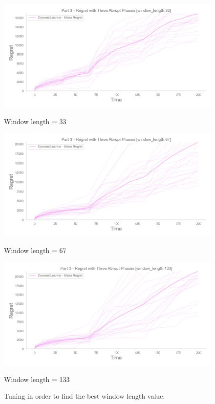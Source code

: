 \begin{figure}[!htb]
	\centering

  		\includegraphics[width=\linewidth]{images/win_length33.png}
  		\caption{Window length = 33}\label{win33}  		
	\endminipage\hfill
  		\includegraphics[width=\linewidth]{images/win_length67.png}
  		\caption{Window length = 67}\label{win67}  
	\endminipage\hfill
  		\includegraphics[width=\linewidth]{images/win_length133.png}
  		\caption{Window length = 133}\label{win133}  
	\endminipage\hfill
	
	\caption{Tuning in order to find the best window length value.}
	\label{winLenValidationFig}
\end{figure}


